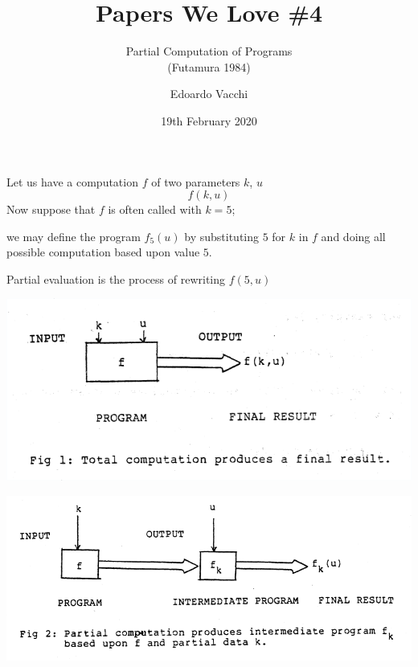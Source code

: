 \documentclass[aspectratio=169]{beamer}
\title{\bf\LARGE Papers We Love \color{gray}{Milano} \#4}
\subtitle{Partial Computation of Programs\\[5pt] (Futamura 1984)}
\author{Edoardo Vacchi}
\date{19th February 2020}
\begin{document}
 
\frame{\titlepage}

\begin{frame}{ex}
    Let us have a computation $f$ of two parameters $k$, $u$
    \[
        f(k,u)
    \]
    Now suppose that $f$ is often called with $k=5$; 
    
    we may define the program $f_5(u)$ by substituting $5$ for $k$ in $f$ 
    and doing all possible computation based upon value $5$.

    Partial evaluation is the process of rewriting $f(5,u)$
\end{frame}
 


\begin{frame}

    \includegraphics[width=\textwidth]{imgs/fig1.png}

\end{frame}
 


\begin{frame}

    \includegraphics[width=\textwidth]{imgs/fig2.png}

\end{frame}
 
\end{document}

